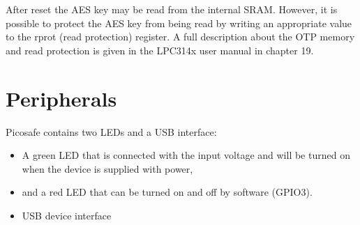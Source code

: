 After reset the AES key may be read from the internal SRAM. However, it is
possible to protect the AES key from being read by writing an appropriate value
to the rprot (read protection) register. A full description about the OTP
memory and read protection is given in the LPC314x user manual in chapter 19.

\section{Peripherals}

Picosafe contains two LEDs and a USB interface:
\begin{itemize}
\item A green LED that is connected with the input voltage and will be turned on when the device is supplied with power,
\item and a red LED that can be turned on and off by software (GPIO3).
\item USB device interface
\end{itemize}
